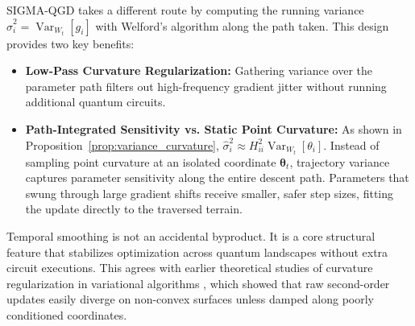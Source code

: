 \documentclass[11pt,a4paper]{article}
\begin{document}
SIGMA-QGD takes a different route by computing the running variance $\hat{\sigma}_i^2 = \operatorname{Var}_{W_t}[g_i]$ with Welford's algorithm along the path taken. This design provides two key benefits:
\begin{itemize}
    \item \textbf{Low-Pass Curvature Regularization:} Gathering variance over the parameter path filters out high-frequency gradient jitter without running additional quantum circuits.
    \item \textbf{Path-Integrated Sensitivity vs. Static Point Curvature:} As shown in Proposition~\ref{prop:variance_curvature}, $\hat{\sigma}_i^2 \approx H_{ii}^2 \operatorname{Var}_{W_t}[\theta_i]$. Instead of sampling point curvature at an isolated coordinate $\boldsymbol{\theta}_t$, trajectory variance captures parameter sensitivity along the entire descent path. Parameters that swung through large gradient shifts receive smaller, safer step sizes, fitting the update directly to the traversed terrain.
\end{itemize}
Temporal smoothing is not an accidental byproduct. It is a core structural feature that stabilizes optimization across quantum landscapes without extra circuit executions. This agrees with earlier theoretical studies of curvature regularization in variational algorithms \cite{stokes2020quantum,wierichs2020avoiding}, which showed that raw second-order updates easily diverge on non-convex surfaces unless damped along poorly conditioned coordinates.
\end{document}
